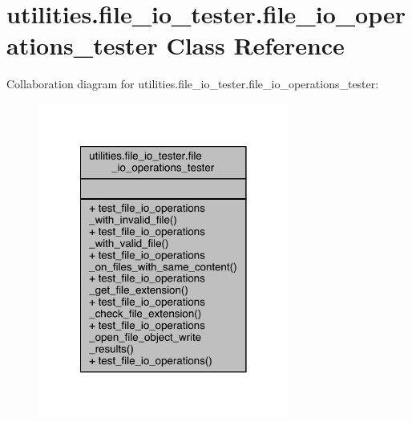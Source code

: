 \hypertarget{classutilities_1_1file__io__tester_1_1file__io__operations__tester}{}\section{utilities.\+file\+\_\+io\+\_\+tester.\+file\+\_\+io\+\_\+operations\+\_\+tester Class Reference}
\label{classutilities_1_1file__io__tester_1_1file__io__operations__tester}


Collaboration diagram for utilities.\+file\+\_\+io\+\_\+tester.\+file\+\_\+io\+\_\+operations\+\_\+tester\+:
\nopagebreak
\begin{figure}[H]
\begin{center}
\leavevmode
\includegraphics[width=234pt]{d8/dec/classutilities_1_1file__io__tester_1_1file__io__operations__tester__coll__graph}
\end{center}
\end{figure}
